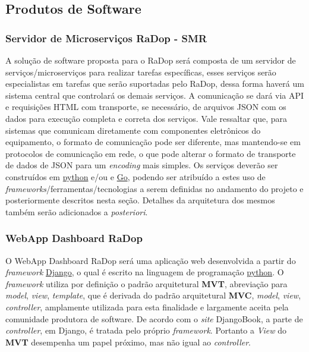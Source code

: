 \subsection{Produtos de Software}\label{produtos-de-software}

\subsubsection{Servidor de Microserviços RaDop - SMR}\label{servidor-de-microservicos-radop---smr}

A solução de software proposta para o RaDop será composta de um servidor de serviços/microserviços para realizar tarefas específicas, esses serviços serão especialistas em tarefas que serão suportadas pelo RaDop, dessa forma haverá um sistema central que controlará os demais serviços. A comunicação se dará via API e requisições HTML com transporte, se necessário, de arquivos JSON com os dados para execução completa e correta dos serviços. Vale ressaltar que, para sistemas que comunicam diretamente com componentes eletrônicos do equipamento, o formato de comunicação pode ser diferente, mas mantendo-se em protocolos de comunicação em rede, o que pode alterar o formato de transporte de dados de JSON para um \emph{encoding} mais simples. Os serviços deverão ser construídos em \href{https://www.python.org/}{python} e/ou e \href{https://golang.org/}{Go}, podendo ser atribuído a estes uso de \emph{frameworks}/ferramentas/tecnologias a serem definidas no andamento do projeto e posteriormente descritos nesta seção. Detalhes da arquitetura dos mesmos também serão adicionados a \emph{posteriori}.

\subsubsection{WebApp Dashboard RaDop}\label{webapp-dashboard-radop}

O WebApp Dashboard RaDop será uma aplicação web desenvolvida a partir do \emph{framework} \href{https://www.djangoproject.com/}{Django}, o qual é escrito na linguagem de programação
\href{https://www.python.org/}{python}. O \emph{framework} utiliza por definição o padrão arquitetural \textbf{MVT}, abreviação para \emph{model}, \emph{view}, \emph{template}, que é derivada do padrão arquitetural \textbf{MVC}, \emph{model}, \emph{view}, \emph{controller}, amplamente utilizada para esta finalidade e largamente aceita pela comunidade produtora de software. De acordo com o \emph{site} DjangoBook, a parte de \emph{controller}, em Django, é tratada pelo próprio \emph{framework}. Portanto a \emph{View} do \textbf{MVT} desempenha um papel próximo, mas não igual ao \emph{controller}.

